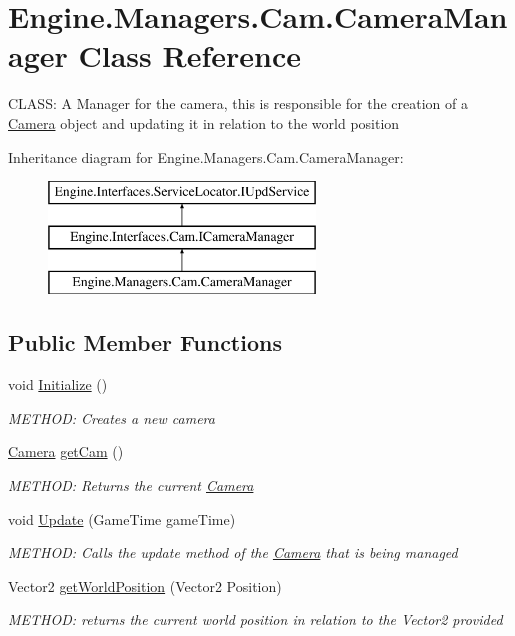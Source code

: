 \hypertarget{a00494}{}\section{Engine.\+Managers.\+Cam.\+Camera\+Manager Class Reference}
\label{a00494}


C\+L\+A\+SS\+: A Manager for the camera, this is responsible for the creation of a \hyperlink{a00490}{Camera} object and updating it in relation to the world position  


Inheritance diagram for Engine.\+Managers.\+Cam.\+Camera\+Manager\+:\begin{figure}[H]
\begin{center}
\leavevmode
\includegraphics[height=3.000000cm]{d5/d0f/a00494}
\end{center}
\end{figure}
\subsection*{Public Member Functions}
\begin{DoxyCompactItemize}
\item 
void \hyperlink{a00494_a6244a0582982e64f49df0a6862768a21}{Initialize} ()
\begin{DoxyCompactList}\small\item\em M\+E\+T\+H\+OD\+: Creates a new camera \end{DoxyCompactList}\item 
\hyperlink{a00490}{Camera} \hyperlink{a00494_a949b09e5c57971945c3ccb638f73765d}{get\+Cam} ()
\begin{DoxyCompactList}\small\item\em M\+E\+T\+H\+OD\+: Returns the current \hyperlink{a00490}{Camera} \end{DoxyCompactList}\item 
void \hyperlink{a00494_a43e367859b47354445da2a304eff7ec4}{Update} (Game\+Time game\+Time)
\begin{DoxyCompactList}\small\item\em M\+E\+T\+H\+OD\+: Calls the update method of the \hyperlink{a00490}{Camera} that is being managed \end{DoxyCompactList}\item 
Vector2 \hyperlink{a00494_a538af3b5745f1f51e3da217d5c971791}{get\+World\+Position} (Vector2 Position)
\begin{DoxyCompactList}\small\item\em M\+E\+T\+H\+OD\+: returns the current world position in relation to the Vector2 provided \end{DoxyCompactList}\end{DoxyCompactItemize}


